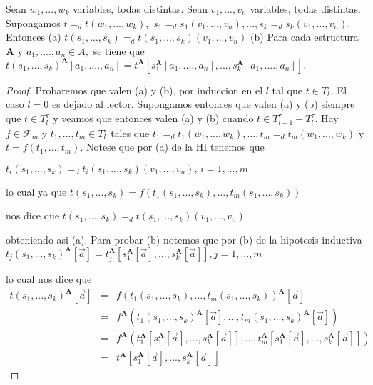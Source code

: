   \begin{lemma}
    Sean \(w_{1},...,w_{k}\) variables, todas distintas. Sean \( v_{1},...,v_{n}\) variables, todas distintas. Supongamos \( t=_{d}t(w_{1},...,w_{k}),\) \( s_{1}=_{d}s_{1}(v_{1},...,v_{n}),...,s_{k}=_{d}s_{k}(v_{1},...,v_{n}).\) Entonces
    (a) \(t(s_{1},...,s_{k})=_{d}t(s_{1},...,s_{k})(v_{1},...,v_{n})\)
    (b) Para cada estructura \(\mathbf{A}\) y \(a_{1},....,a_{n}\in A,\) se tiene que
    \(\displaystyle t(s_{1},...,s_{k})^{\mathbf{A}}[a_{1},....,a_{n}]=t^{\mathbf{A}}[s_{1}^{ \mathbf{A}}[a_{1},....,a_{n}],...,s_{k}^{\mathbf{A}}[a_{1},....,a_{n}]]. \)
  \end{lemma}
  \begin{proof}
    Probaremos que valen (a) y (b), por induccion en el \(l\) tal que \(t\in T_{l}^{\tau }.\) El caso \(l=0\) es dejado al lector. Supongamos entonces que valen (a) y (b) siempre que \(t\in T_{l}^{\tau }\) y veamos que entonces valen (a) y (b) cuando \(t\in T_{l+1}^{\tau }-T_{l}^{\tau }\). Hay \(f\in \mathcal{F} _{m}\) y \(t_{1},...,t_{m}\in T_{l}^{\tau }\) tales que \( t_{1}=_{d}t_{1}(w_{1},...,w_{k}),...,t_{m}=_{d}t_{m}(w_{1},...,w_{k})\) y \( t=f(t_{1},...,t_{m})\). Notese que por (a) de la HI tenemos que

    \(\displaystyle t_{i}(s_{1},...,s_{k})=_{d}t_{i}(s_{1},...,s_{k})(v_{1},...,v_{n})\text{, } i=1,...,m \)

    lo cual ya que
    \(\displaystyle t(s_{1},...,s_{k})=f(t_{1}(s_{1},...,s_{k}),...,t_{m}(s_{1},...,s_{k})) \)

    nos dice que
    \(\displaystyle t(s_{1},...,s_{k})=_{d}t(s_{1},...,s_{k})(v_{1},...,v_{n}) \)

    obteniendo asi (a). Para probar (b) notemos que por (b) de la hipotesis inductiva
    \(\displaystyle t_{j}(s_{1},...,s_{k})^{\mathbf{A}}[\vec{a}]=t_{j}^{\mathbf{A}}[s_{1}^{ \mathbf{A}}[\vec{a}],...,s_{k}^{\mathbf{A}}[\vec{a}]],j=1,...,m \)

    lo cual nos dice que
    \(\displaystyle \begin{array}{ccl} t(s_{1},...,s_{k})^{\mathbf{A}}[\vec{a}] & = & f(t_{1}(s_{1},...,s_{k}),...,t_{m}(s_{1},...,s_{k}))^{\mathbf{A}}[\vec{a}] \\ & = & f^{\mathbf{A}}(t_{1}(s_{1},...,s_{k})^{\mathbf{A}}[\vec{a} ],...,t_{m}(s_{1},...,s_{k})^{\mathbf{A}}[\vec{a}]) \\ & = & f^{\mathbf{A}}(t_{1}^{\mathbf{A}}[s_{1}^{\mathbf{A}}[\vec{a} ],...,s_{k}^{\mathbf{A}}[\vec{a}]],...,t_{m}^{\mathbf{A}}[s_{1}^{\mathbf{A}}[ \vec{a}],...,s_{k}^{\mathbf{A}}[\vec{a}]]) \\ & = & t^{\mathbf{A}}[s_{1}^{\mathbf{A}}[\vec{a}],...,s_{k}^{\mathbf{A}}[\vec{ a}]] \end{array} \)
  \end{proof}


